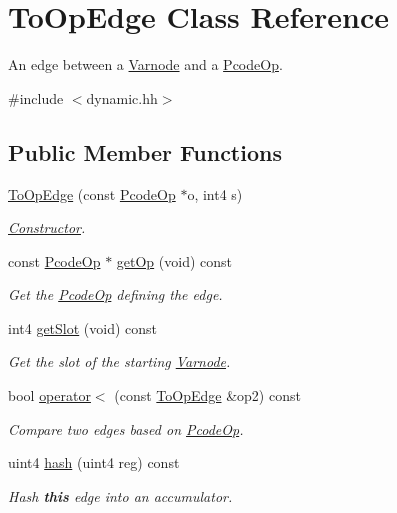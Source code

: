 \hypertarget{class_to_op_edge}{}\section{To\+Op\+Edge Class Reference}
\label{class_to_op_edge}


An edge between a \mbox{\hyperlink{class_varnode}{Varnode}} and a \mbox{\hyperlink{class_pcode_op}{Pcode\+Op}}.  




{\ttfamily \#include $<$dynamic.\+hh$>$}

\subsection*{Public Member Functions}
\begin{DoxyCompactItemize}
\item 
\mbox{\hyperlink{class_to_op_edge_a21ac9abba2a0057fedddf9d50b4bb747}{To\+Op\+Edge}} (const \mbox{\hyperlink{class_pcode_op}{Pcode\+Op}} $\ast$o, int4 s)
\begin{DoxyCompactList}\small\item\em \mbox{\hyperlink{class_constructor}{Constructor}}. \end{DoxyCompactList}\item 
const \mbox{\hyperlink{class_pcode_op}{Pcode\+Op}} $\ast$ \mbox{\hyperlink{class_to_op_edge_aa3a15c158a60145471dcd8072c3f9683}{get\+Op}} (void) const
\begin{DoxyCompactList}\small\item\em Get the \mbox{\hyperlink{class_pcode_op}{Pcode\+Op}} defining the edge. \end{DoxyCompactList}\item 
int4 \mbox{\hyperlink{class_to_op_edge_a4b09f46810c4a09f45fea92bc23d6841}{get\+Slot}} (void) const
\begin{DoxyCompactList}\small\item\em Get the slot of the starting \mbox{\hyperlink{class_varnode}{Varnode}}. \end{DoxyCompactList}\item 
bool \mbox{\hyperlink{class_to_op_edge_ac11e6b4cd5c581a6297957e84f38cf2c}{operator$<$}} (const \mbox{\hyperlink{class_to_op_edge}{To\+Op\+Edge}} \&op2) const
\begin{DoxyCompactList}\small\item\em Compare two edges based on \mbox{\hyperlink{class_pcode_op}{Pcode\+Op}}. \end{DoxyCompactList}\item 
uint4 \mbox{\hyperlink{class_to_op_edge_a1a18d58e3a6b8686df271cf7911e35a2}{hash}} (uint4 reg) const
\begin{DoxyCompactList}\small\item\em Hash {\bfseries{this}} edge into an accumulator. \end{DoxyCompactList}\end{DoxyCompactItemize}


